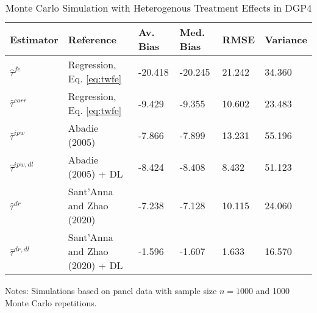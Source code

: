 \begin{table}[]
\centering
\begin{threeparttable}
\caption{Monte Carlo Simulation with Heterogenous Treatment Effects in DGP4}
\label{tab:table3}
\begin{tabular}{llllll}
\toprule
Estimator         & Reference                         & Av. Bias   & Med. Bias   & RMSE & Variance  \\ \midrule
\addlinespace
$\hat{\tau}^{fe}$ & Regression, Eq. \eqref{eq:twfe}               & -20.418      & -20.245        & 21.242 & 34.360      \\
$\hat{\tau}^{corr}$ & Regression, Eq. \eqref{eq:twfe}           & -9.429      & -9.355       & 10.602 & 23.483      \\
$\hat{\tau}^{ipw}$ & Abadie (2005)                    & -7.866       & -7.899       & 13.231 & 55.196      \\
$\hat{\tau}^{ipw,dl}$ & Abadie (2005) + DL            & -8.424       & -8.408        & 8.432 & 51.123      \\
$\hat{\tau}^{dr}$ & Sant'Anna and Zhao (2020)         & -7.238      & -7.128        & 10.115 & 24.060      \\
$\hat{\tau}^{dr,dl}$ & Sant'Anna and Zhao (2020) + DL & -1.596       & -1.607        & 1.633 & 16.570      \\

\bottomrule
\end{tabular}
\begin{tablenotes}
    \item Notes: Simulations based on panel data with sample size $n = 1000$ and 1000 Monte Carlo repetitions.
\end{tablenotes}
\end{threeparttable}
\end{table}
